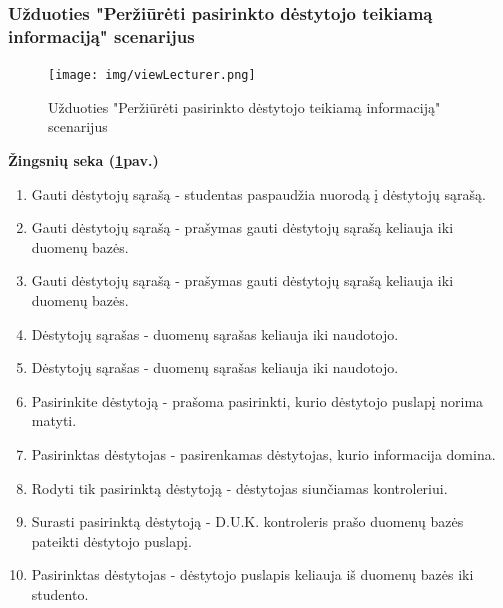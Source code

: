 \documentclass{VUMIFPSkursinis}
\begin{document}
\subsubsection{Užduoties "Peržiūrėti pasirinkto dėstytojo teikiamą informaciją" scenarijus}
\begin{figure}[H]
	\centering
	\texttt{[image: img/viewLecturer.png]}
	\caption{Užduoties "Peržiūrėti pasirinkto dėstytojo teikiamą informaciją" scenarijus}
	\label{fig:viewLec}
\end{figure}
\textbf{Žingsnių seka (\ref{fig:viewLec}pav.)}\\
\begin{enumerate}
	\item Gauti dėstytojų sąrašą - studentas paspaudžia nuorodą į dėstytojų sąrašą.
	\item Gauti dėstytojų sąrašą - prašymas gauti dėstytojų sąrašą keliauja iki duomenų bazės.
	\item Gauti dėstytojų sąrašą - prašymas gauti dėstytojų sąrašą keliauja iki duomenų bazės.
	\item Dėstytojų sąrašas - duomenų sąrašas keliauja iki naudotojo.
	\item Dėstytojų sąrašas -  duomenų sąrašas keliauja iki naudotojo.
	\item Pasirinkite dėstytoją - prašoma pasirinkti, kurio dėstytojo puslapį norima matyti.
	\item Pasirinktas dėstytojas - pasirenkamas dėstytojas, kurio informacija domina.
	\item Rodyti tik pasirinktą dėstytoją - dėstytojas siunčiamas kontroleriui.
	\item Surasti pasirinktą dėstytoją -  D.U.K. kontroleris prašo duomenų bazės pateikti dėstytojo puslapį.
	\item Pasirinktas dėstytojas - dėstytojo puslapis keliauja iš duomenų bazės iki studento.
\end{enumerate}
\end{document}
